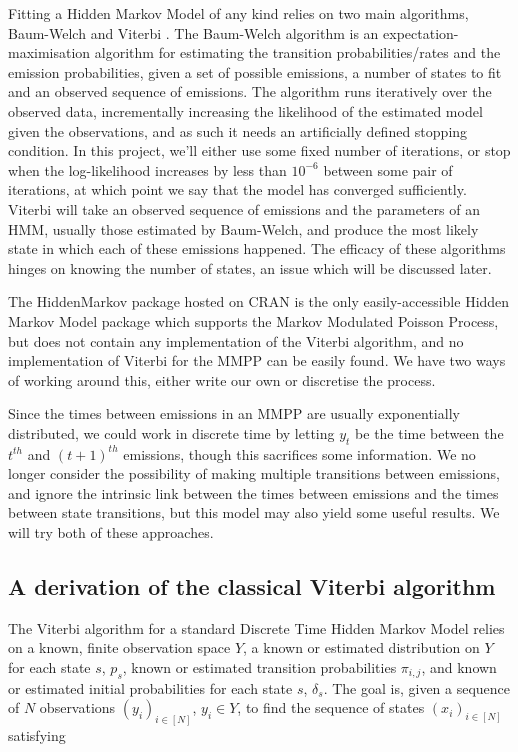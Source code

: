 Fitting a Hidden Markov Model of any kind relies on two main algorithms, Baum-Welch \cite{baumwelch} and Viterbi \cite{viterbi}. The Baum-Welch algorithm is an expectation-maximisation algorithm for estimating the transition probabilities/rates and the emission probabilities, given a set of possible emissions, a number of states to fit and an observed sequence of emissions. The algorithm runs iteratively over the observed data, incrementally increasing the likelihood of the estimated model given the observations, and as such it needs an artificially defined stopping condition. In this project, we'll either use some fixed number of iterations, or stop when the log-likelihood increases by less than $10^{-6}$ between some pair of iterations, at which point we say that the model has converged sufficiently. Viterbi will take an observed sequence of emissions and the parameters of an HMM, usually those estimated by Baum-Welch, and produce the most likely state in which each of these emissions happened. The efficacy of these algorithms hinges on knowing the number of states, an issue which will be discussed later.

The HiddenMarkov package hosted on CRAN \cite{hiddenmarkov} is the only easily-accessible Hidden Markov Model package which supports the Markov Modulated Poisson Process, but does not contain any implementation of the Viterbi algorithm, and no implementation of Viterbi for the MMPP can be easily found. We have two ways of working around this, either write our own or discretise the process.

Since the times between emissions in an MMPP are usually exponentially distributed, we could work in discrete time by letting $y_t$ be the time between the $t^{th}$ and $(t+1)^{th}$ emissions, though this sacrifices some information. We no longer consider the possibility of making multiple transitions between emissions, and ignore the intrinsic link between the times between emissions and the times between state transitions, but this model may also yield some useful results. We will try both of these approaches.

\subsection{A derivation of the classical Viterbi algorithm}

The Viterbi algorithm for a standard Discrete Time Hidden Markov Model relies on a known, finite observation space $Y$, a known or estimated distribution on $Y$ for each state $s$, $p_s$,  known or estimated transition probabilities $\pi_{i,j}$, and known or estimated initial probabilities for each state $s$, $\delta_s$. The goal is, given a sequence of $N$ observations $(y_i)_{i \in [N]}$, $y_i \in Y$, to find the sequence of states $(x_i)_{i \in [N]}$ satisfying

